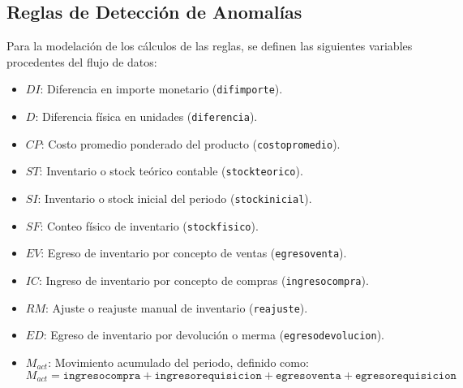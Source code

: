 \documentclass[11pt]{article}
\begin{document}
  \subsection*{Reglas de Detección de Anomalías}
  Para la modelación de los cálculos de las reglas, se definen las siguientes variables procedentes del flujo de datos:
\begin{itemize}
    \item $DI$: Diferencia en importe monetario (\texttt{difimporte}).
    \item $D$: Diferencia física en unidades (\texttt{diferencia}).
    \item $CP$: Costo promedio ponderado del producto (\texttt{costopromedio}).
    \item $ST$: Inventario o stock teórico contable (\texttt{stockteorico}).
    \item $SI$: Inventario o stock inicial del periodo (\texttt{stockinicial}).
    \item $SF$: Conteo físico de inventario (\texttt{stockfisico}).
    \item $EV$: Egreso de inventario por concepto de ventas (\texttt{egresoventa}).
    \item $IC$: Ingreso de inventario por concepto de compras (\texttt{ingresocompra}).
    \item $RM$: Ajuste o reajuste manual de inventario (\texttt{reajuste}).
    \item $ED$: Egreso de inventario por devolución o merma (\texttt{egresodevolucion}).
    \item $M_{act}$: Movimiento acumulado del periodo, definido como:
    \[ M_{act} = \texttt{ingresocompra} + \texttt{ingresorequisicion} + \texttt{egresoventa} + \texttt{egresorequisicion} \]
\end{itemize}
\end{document}
